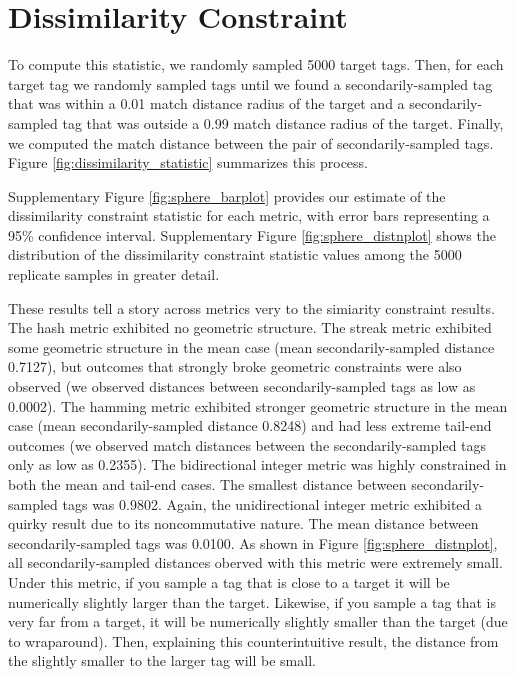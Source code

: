 \section{Dissimilarity Constraint} \label{sec:dissimilarityconstraint}



To compute this statistic, we randomly sampled 5000 target tags.
Then, for each target tag we randomly sampled tags until we found a secondarily-sampled tag that was within a 0.01 match distance radius of the target and a secondarily-sampled tag that was outside a 0.99 match distance radius of the target.
Finally, we computed the match distance between the pair of secondarily-sampled tags.
Figure \ref{fig:dissimilarity_statistic} summarizes this process.



Supplementary Figure \ref{fig:sphere_barplot} provides our estimate of the dissimilarity constraint statistic for each metric, with error bars representing a 95\% confidence interval.
Supplementary Figure \ref{fig:sphere_distnplot} shows the distribution of the dissimilarity constraint statistic values among the 5000 replicate samples in greater detail.

These results tell a story across metrics very to the simiarity constraint results.
The hash metric exhibited no geometric structure.
The streak metric exhibited some geometric structure in the mean case (mean secondarily-sampled distance 0.7127), but outcomes that strongly broke geometric constraints were also observed (we observed distances between secondarily-sampled tags as low as 0.0002).
The hamming metric exhibited stronger geometric structure in the mean case (mean secondarily-sampled distance 0.8248) and had less extreme tail-end outcomes (we observed match distances between the secondarily-sampled tags only as low as 0.2355).
The bidirectional integer metric was highly constrained in both the mean and tail-end cases.
The smallest distance between secondarily-sampled tags was 0.9802.
Again, the unidirectional integer metric exhibited a quirky result due to its noncommutative nature.
The mean distance between secondarily-sampled tags was 0.0100.
As shown in Figure \ref{fig:sphere_distnplot}, all secondarily-sampled distances oberved with this metric were extremely small.
Under this metric, if you sample a tag that is close to a target it will be numerically slightly larger than the target.
Likewise, if you sample a tag that is very far from a target, it will be numerically slightly smaller than the target (due to wraparound).
Then, explaining this counterintuitive result, the distance from the slightly smaller to the larger tag will be small.
